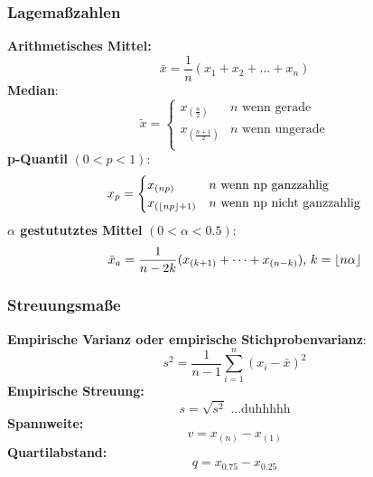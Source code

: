 \documentclass[
	ngerman,
	accentcolor=9c,%
	type=intern,
	marginpar=false
	]{tudapub}
\DeclarePairedDelimiter\floor{\lfloor}{\rfloor}
\begin{document}
            \subsubsection{Lagemaßzahlen}
                \textbf{Arithmetisches Mittel:}
                \begin{equation*}
                    \bar{x}=\dfrac{1}{n}(x_1+x_2+\dots+x_n)
                \end{equation*}
                \textbf{Median}:
                \begin{equation}
                    \tilde{x} =
                    \begin{cases}
                        x_{(\frac{n}{2})} & n \text{ wenn gerade}\\
                        x_{(\frac{n+1}{2})} & n \text{ wenn ungerade}\\
                    \end{cases}
                \end{equation}
                \textbf{p-Quantil} $(0<p<1)$:
                \begin{equation}
                    x_p=
                    \begin{cases}
                        x_{(np)} & n \text{ wenn np ganzzahlig}\\
                        x_{(\floor{np}+1)} & n \text{ wenn np nicht ganzzahlig}\\
                    \end{cases}
                \end{equation}
                \textbf{$\alpha$ gestututztes Mittel} $(0<\alpha<0.5)$:
                \begin{equation*}
                    \bar{x}_a = \dfrac{1}{n-2k}(x_{(k+1)} + \dots + x_{(n-k)})\mbox{, }k=\floor{n\alpha}
                \end{equation*}
            \subsubsection{Streuungsmaße}
                \textbf{Empirische Varianz oder empirische Stichprobenvarianz}:
                \begin{equation*}
                    s^2 = \dfrac{1}{n-1}\sum_{i=1}^n (x_i - \bar{x})^2
                \end{equation*}
                \textbf{Empirische Streuung:}
                \begin{equation*}
                    s = \sqrt{s^2} \text{ ...duhhhhh}
                \end{equation*}
                \textbf{Spannweite:}
                \begin{equation*}
                    v= x_{(n)} - x_{(1)}
                \end{equation*}
                \textbf{Quartilabstand:}
                \begin{equation*}
                    q = x_{0.75} - x_{0.25}
                \end{equation*}
\end{document}
